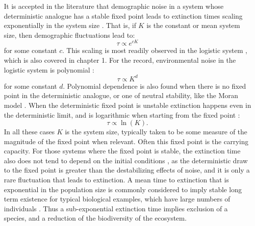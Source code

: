 It is accepted in the literature that demographic noise in a system whose deterministic analogue has a stable fixed point leads to extinction times scaling exponentially in the system size \cite{Leigh1981,Lande1993,Kamenev2008,Cremer2009a,Dobrinevski2012,Yu2017}. 
That is, if $K$ is the constant or mean system size, then demographic fluctuations lead to:
\begin{equation*}
\tau \propto e^{cK}
\end{equation*}
for some constant $c$. 
This scaling is most readily observed in the logistic system \cite{Norden1982,Foley1994,Allen2003a,Doering2005,Assaf2006,Assaf2010,Assaf2016}, which is also covered in chapter 1. %
For the record, environmental noise in the logistic system is polynomial \cite{Foley1994,Ovaskainen2010}:
\begin{equation*}
\tau \propto K^d
\end{equation*}
for some constant $d$. 
Polynomial dependence is also found when there is no fixed point in the deterministic analogue, or one of neutral stability, like the Moran model \cite{Cremer2009,Dobrinevski2012}. 
When the deterministic fixed point is unstable extinction happens even in the deterministic limit, and is logarithmic when starting from the fixed point \cite{Lande1993,Dobrinevski2012}:
\begin{equation*}
\tau \propto \ln(K). 
\end{equation*}
In all these cases $K$ is the system size, typically taken to be some measure of the magnitude of the fixed point when relevant. 
Often this fixed point is the carrying capacity. 
For those systems where the fixed point is stable, the extinction time also does not tend to depend on the initial conditions \cite{Chotibut2015}, as the deterministic draw to the fixed point is greater than the destabilizing effects of noise, and it is only a rare fluctuation that leads to extinction. 
A mean time to extinction that is exponential in the population size is commonly considered to imply stable long term existence for typical biological examples, which have large numbers of individuals \cite{Ovaskainen2010,Lin2015}. 
Thus a sub-exponential extinction time implies exclusion of a species, and a reduction of the biodiversity of the ecosystem. 

